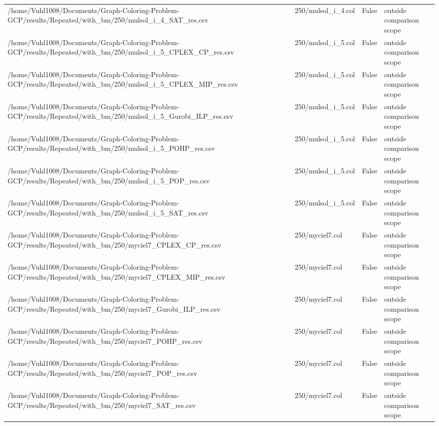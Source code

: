 \begin{table}[htbp]
\begin{tabular}{llll}
/home/Vuhl1008/Documents/Graph-Coloring-Problem-GCP/results/Repeated/with\_bm/250/mulsol\_i\_4\_SAT\_res.csv & 250/mulsol\_i\_4.col & False & outside comparison scope \\
/home/Vuhl1008/Documents/Graph-Coloring-Problem-GCP/results/Repeated/with\_bm/250/mulsol\_i\_5\_CPLEX\_CP\_res.csv & 250/mulsol\_i\_5.col & False & outside comparison scope \\
/home/Vuhl1008/Documents/Graph-Coloring-Problem-GCP/results/Repeated/with\_bm/250/mulsol\_i\_5\_CPLEX\_MIP\_res.csv & 250/mulsol\_i\_5.col & False & outside comparison scope \\
/home/Vuhl1008/Documents/Graph-Coloring-Problem-GCP/results/Repeated/with\_bm/250/mulsol\_i\_5\_Gurobi\_ILP\_res.csv & 250/mulsol\_i\_5.col & False & outside comparison scope \\
/home/Vuhl1008/Documents/Graph-Coloring-Problem-GCP/results/Repeated/with\_bm/250/mulsol\_i\_5\_POHP\_res.csv & 250/mulsol\_i\_5.col & False & outside comparison scope \\
/home/Vuhl1008/Documents/Graph-Coloring-Problem-GCP/results/Repeated/with\_bm/250/mulsol\_i\_5\_POP\_res.csv & 250/mulsol\_i\_5.col & False & outside comparison scope \\
/home/Vuhl1008/Documents/Graph-Coloring-Problem-GCP/results/Repeated/with\_bm/250/mulsol\_i\_5\_SAT\_res.csv & 250/mulsol\_i\_5.col & False & outside comparison scope \\
/home/Vuhl1008/Documents/Graph-Coloring-Problem-GCP/results/Repeated/with\_bm/250/myciel7\_CPLEX\_CP\_res.csv & 250/myciel7.col & False & outside comparison scope \\
/home/Vuhl1008/Documents/Graph-Coloring-Problem-GCP/results/Repeated/with\_bm/250/myciel7\_CPLEX\_MIP\_res.csv & 250/myciel7.col & False & outside comparison scope \\
/home/Vuhl1008/Documents/Graph-Coloring-Problem-GCP/results/Repeated/with\_bm/250/myciel7\_Gurobi\_ILP\_res.csv & 250/myciel7.col & False & outside comparison scope \\
/home/Vuhl1008/Documents/Graph-Coloring-Problem-GCP/results/Repeated/with\_bm/250/myciel7\_POHP\_res.csv & 250/myciel7.col & False & outside comparison scope \\
/home/Vuhl1008/Documents/Graph-Coloring-Problem-GCP/results/Repeated/with\_bm/250/myciel7\_POP\_res.csv & 250/myciel7.col & False & outside comparison scope \\
/home/Vuhl1008/Documents/Graph-Coloring-Problem-GCP/results/Repeated/with\_bm/250/myciel7\_SAT\_res.csv & 250/myciel7.col & False & outside comparison scope \\

\end{tabular}
\end{table}
